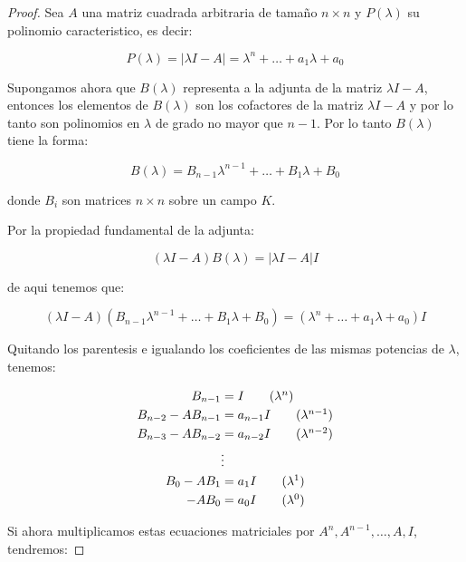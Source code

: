 	\begin{proof}
		Sea $A$ una matriz cuadrada arbitraria de tamaño $n \times n$ y $P(\lambda)$ su polinomio caracteristico, es decir:

		\begin{equation*}
			P(\lambda) = |\lambda I - A| = \lambda^n + \dots + a_1 \lambda + a_0
		\end{equation*}

		Supongamos ahora que $B(\lambda)$ representa a la adjunta de la matriz $\lambda I - A$, entonces los elementos de $B(\lambda)$ son los cofactores de la matriz $\lambda I - A$ y por lo tanto son polinomios en $\lambda$ de grado no mayor que $n-1$.
		Por lo tanto $B(\lambda)$ tiene la forma:

		\begin{equation*}
			B(\lambda) = B_{n-1} \lambda^{n-1} + \dots + B_1 \lambda + B_0
		\end{equation*}

		donde $B_i$ son matrices $n \times n$ sobre un campo $K$.

		Por la propiedad fundamental de la adjunta:

		\begin{equation*}
			(\lambda I - A) B(\lambda) = |\lambda I - A| I
		\end{equation*}

		de aqui tenemos que:

		\begin{equation*}
			(\lambda I - A) (B_{n-1} \lambda^{n-1} + \dots + B_1 \lambda + B_0) = (\lambda^n + \dots + a_1 \lambda + a_0) I
		\end{equation*}

		Quitando los parentesis e igualando los coeficientes de las mismas potencias de $\lambda$, tenemos:

		\begin{align*}
			B_{n-1} &= I \tag{$\lambda^n$} \\
			B_{n-2} - A B_{n-1} &= a_{n-1} I \tag{$\lambda^{n-1}$} \\
			B_{n-3} - A B_{n-2} &= a_{n-2} I \tag{$\lambda^{n-2}$} \\
			&\vdots \\
			B_0 - A B_1 &= a_1 I \tag{$\lambda^1$} \\
			- A B_0 &= a_0 I \tag{$\lambda^0$}
		\end{align*}

		Si ahora multiplicamos estas ecuaciones matriciales por $A^n, A^{n-1}, \dots, A, I$, tendremos:


\end{proof}
